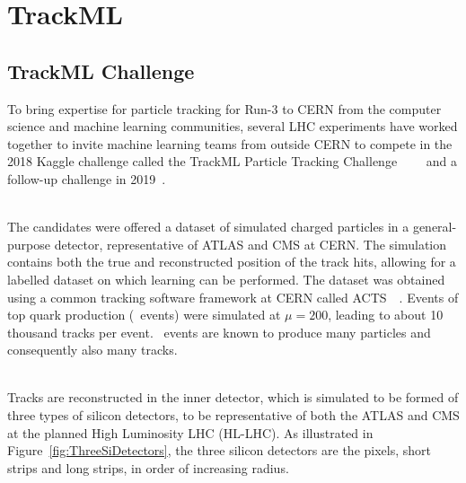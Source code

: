 \chapter{TrackML}
\label{chapter:TrackML}

\section{TrackML Challenge}

To bring expertise for particle tracking for Run-3 to CERN from the computer science and machine learning communities, several LHC experiments have worked together to invite machine learning teams from outside CERN to compete in the 2018 Kaggle challenge called the TrackML Particle Tracking Challenge~\cite{TrackML}~\cite{TrackMLPPTBefore}~\cite{TrackMLPPTAfter}~\cite{TrackMLPPTAfter2} and a follow-up challenge in 2019~\cite{TrackML2}.

\ \\The candidates were offered a dataset of simulated charged particles in a general-purpose detector, representative of ATLAS and CMS at CERN. The simulation contains both the true and reconstructed position of the track hits, allowing for a labelled dataset on which learning can be performed. The dataset was obtained using a common tracking software framework at CERN called ACTS~\cite{ACTS}~\cite{ACTSPPT}. Events of top quark production (\ttbar~events) were simulated at $\mu=200$, leading to about 10 thousand tracks per event. \ttbar~events are known to produce many particles and consequently also many tracks. 

\ \\Tracks are reconstructed in the inner detector, which is simulated to be formed of three types of silicon detectors, to be representative of both the ATLAS and CMS at the planned High Luminosity LHC (HL-LHC). As illustrated in Figure~\ref{fig:ThreeSiDetectors}, the three silicon detectors are the pixels, short strips and long strips, in order of increasing radius. 

